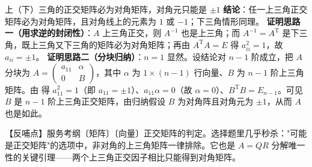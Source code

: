 \begin{fdeep}{上（下）三角的正交矩阵必为对角矩阵，对角元只能是 $\pm1$}
\textbf{结论}：任一上三角正交矩阵必为对角矩阵，且对角线上的元素为 $1$ 或 $-1$；下三角情形同理。
\textbf{证明思路一（用求逆的封闭性）}：$A$ 上三角正交，则 $A^{-1}$ 也是上三角；而 $A^{-1}=A^{\mathrm T}$ 是下三角，既上三角又下三角的矩阵必为对角矩阵；再由 $A^{\mathrm T}A=E$ 得 $a_{ii}^{2}=1$，故 $a_{ii}=\pm1$。
\textbf{证明思路二（分块归纳）}：$n=1$ 显然。设结论对 $n-1$ 阶成立，把 $A$ 分块为 $A=\begin{pmatrix}a_{11}&\alpha\\ 0&B\end{pmatrix}$，其中 $\alpha$ 为 $1\times(n-1)$ 行向量、$B$ 为 $n-1$ 阶上三角矩阵。由
得 $a_{11}^{2}=1$（即 $a_{11}=\pm1$）、$a_{11}\alpha=0$（故 $\alpha=0$）、$B^{\mathrm T}B=E_{n-1}$。可见 $B$ 是 $n-1$ 阶上三角正交矩阵，由归纳假设 $B$ 为对角阵且对角元为 $\pm1$，从而 $A$ 也是如此。

【反哺点】服务考纲〔矩阵〕〔向量〕正交矩阵的判定。选择题里几乎秒杀："可能是正交矩阵"的选项中，非对角的上三角矩阵一律排除。它也是 $A=QR$ 分解唯一性的关键引理——两个上三角正交因子相比只能得到对角矩阵。
\end{fdeep}


